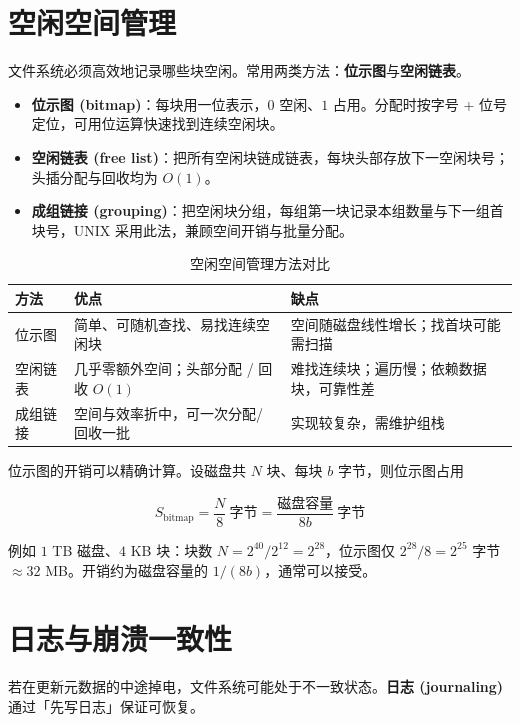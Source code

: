 \section{空闲空间管理}

文件系统必须高效地记录哪些块空闲。常用两类方法：\textbf{位示图}与\textbf{空闲链表}。

\begin{itemize}
    \item \textbf{位示图 (bitmap)}：每块用一位表示，$0$ 空闲、$1$ 占用。分配时按字号 + 位号定位，可用位运算快速找到连续空闲块。
    \item \textbf{空闲链表 (free list)}：把所有空闲块链成链表，每块头部存放下一空闲块号；头插分配与回收均为 $O(1)$。
    \item \textbf{成组链接 (grouping)}：把空闲块分组，每组第一块记录本组数量与下一组首块号，UNIX 采用此法，兼顾空间开销与批量分配。
\end{itemize}

\begin{table}[H]
\centering
\caption{空闲空间管理方法对比}
\begin{tabulary}{\textwidth}{LLL}
\toprule
方法 & 优点 & 缺点 \\
\midrule
位示图 & 简单、可随机查找、易找连续空闲块 & 空间随磁盘线性增长；找首块可能需扫描 \\
空闲链表 & 几乎零额外空间；头部分配 / 回收 $O(1)$ & 难找连续块；遍历慢；依赖数据块，可靠性差 \\
成组链接 & 空间与效率折中，可一次分配/回收一批 & 实现较复杂，需维护组栈 \\
\bottomrule
\end{tabulary}
\end{table}

位示图的开销可以精确计算。设磁盘共 $N$ 块、每块 $b$ 字节，则位示图占用

\begin{equation}
    S_{\text{bitmap}} = \frac{N}{8}\ \text{字节} = \frac{\text{磁盘容量}}{8b}\ \text{字节}
\end{equation}

例如 $1$ TB 磁盘、$4$ KB 块：块数 $N = 2^{40}/2^{12} = 2^{28}$，位示图仅 $2^{28}/8 = 2^{25}$ 字节 $\approx 32$ MB。开销约为磁盘容量的 $1/(8b)$，通常可以接受。

\section{日志与崩溃一致性}

若在更新元数据的中途掉电，文件系统可能处于不一致状态。\textbf{日志 (journaling)} 通过「先写日志」保证可恢复。

